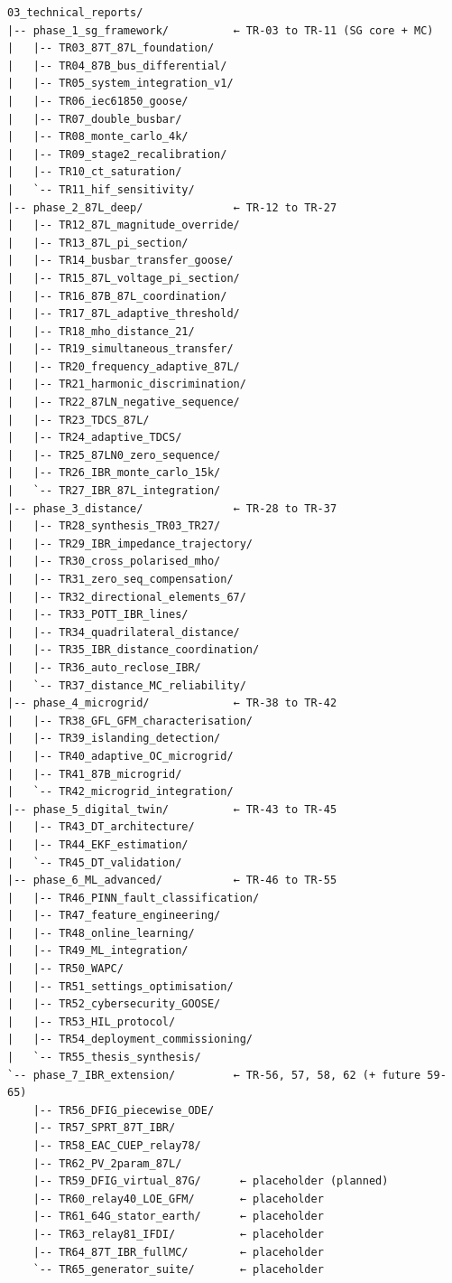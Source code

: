 \documentclass[11pt,a4paper]{article}
\begin{document}
\begin{verbatim}
03_technical_reports/
|-- phase_1_sg_framework/          ← TR-03 to TR-11 (SG core + MC)
|   |-- TR03_87T_87L_foundation/
|   |-- TR04_87B_bus_differential/
|   |-- TR05_system_integration_v1/
|   |-- TR06_iec61850_goose/
|   |-- TR07_double_busbar/
|   |-- TR08_monte_carlo_4k/
|   |-- TR09_stage2_recalibration/
|   |-- TR10_ct_saturation/
|   `-- TR11_hif_sensitivity/
|-- phase_2_87L_deep/              ← TR-12 to TR-27
|   |-- TR12_87L_magnitude_override/
|   |-- TR13_87L_pi_section/
|   |-- TR14_busbar_transfer_goose/
|   |-- TR15_87L_voltage_pi_section/
|   |-- TR16_87B_87L_coordination/
|   |-- TR17_87L_adaptive_threshold/
|   |-- TR18_mho_distance_21/
|   |-- TR19_simultaneous_transfer/
|   |-- TR20_frequency_adaptive_87L/
|   |-- TR21_harmonic_discrimination/
|   |-- TR22_87LN_negative_sequence/
|   |-- TR23_TDCS_87L/
|   |-- TR24_adaptive_TDCS/
|   |-- TR25_87LN0_zero_sequence/
|   |-- TR26_IBR_monte_carlo_15k/
|   `-- TR27_IBR_87L_integration/
|-- phase_3_distance/              ← TR-28 to TR-37
|   |-- TR28_synthesis_TR03_TR27/
|   |-- TR29_IBR_impedance_trajectory/
|   |-- TR30_cross_polarised_mho/
|   |-- TR31_zero_seq_compensation/
|   |-- TR32_directional_elements_67/
|   |-- TR33_POTT_IBR_lines/
|   |-- TR34_quadrilateral_distance/
|   |-- TR35_IBR_distance_coordination/
|   |-- TR36_auto_reclose_IBR/
|   `-- TR37_distance_MC_reliability/
|-- phase_4_microgrid/             ← TR-38 to TR-42
|   |-- TR38_GFL_GFM_characterisation/
|   |-- TR39_islanding_detection/
|   |-- TR40_adaptive_OC_microgrid/
|   |-- TR41_87B_microgrid/
|   `-- TR42_microgrid_integration/
|-- phase_5_digital_twin/          ← TR-43 to TR-45
|   |-- TR43_DT_architecture/
|   |-- TR44_EKF_estimation/
|   `-- TR45_DT_validation/
|-- phase_6_ML_advanced/           ← TR-46 to TR-55
|   |-- TR46_PINN_fault_classification/
|   |-- TR47_feature_engineering/
|   |-- TR48_online_learning/
|   |-- TR49_ML_integration/
|   |-- TR50_WAPC/
|   |-- TR51_settings_optimisation/
|   |-- TR52_cybersecurity_GOOSE/
|   |-- TR53_HIL_protocol/
|   |-- TR54_deployment_commissioning/
|   `-- TR55_thesis_synthesis/
`-- phase_7_IBR_extension/         ← TR-56, 57, 58, 62 (+ future 59-65)
    |-- TR56_DFIG_piecewise_ODE/
    |-- TR57_SPRT_87T_IBR/
    |-- TR58_EAC_CUEP_relay78/
    |-- TR62_PV_2param_87L/
    |-- TR59_DFIG_virtual_87G/      ← placeholder (planned)
    |-- TR60_relay40_LOE_GFM/       ← placeholder
    |-- TR61_64G_stator_earth/      ← placeholder
    |-- TR63_relay81_IFDI/          ← placeholder
    |-- TR64_87T_IBR_fullMC/        ← placeholder
    `-- TR65_generator_suite/       ← placeholder
\end{verbatim}
\end{document}
